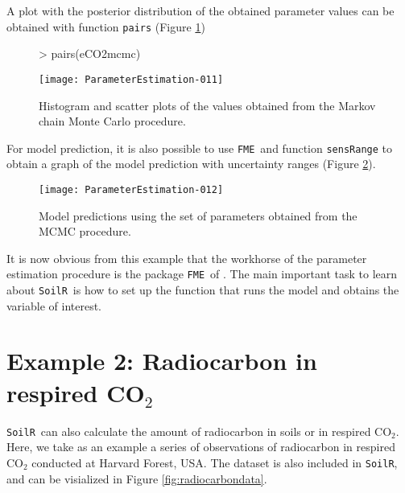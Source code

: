 \documentclass[a4paper]{article}
\newcommand{\SoilR}{\texttt{SoilR}}
\newcommand{\FME}{\texttt{FME}}
\begin{document}
A plot with the posterior distribution of the obtained parameter values can be obtained with function {\tt pairs} (Figure \ref{fig:mcmc})

\begin{figure}
  \centering
\begin{Schunk}
\begin{Sinput}
> pairs(eCO2mcmc)
\end{Sinput}
\end{Schunk}
\texttt{[image: ParameterEstimation-011]}
  \caption{Histogram and scatter plots of the values obtained from the Markov chain Monte Carlo procedure.}
  \label{fig:mcmc}
\end{figure}

For model prediction, it is also possible to use \FME \, and function {\tt sensRange} to obtain a graph of the model prediction with uncertainty ranges (Figure \ref{fig:sensRange}).

\begin{figure}
  \centering
\begin{Schunk}
\end{Schunk}
\texttt{[image: ParameterEstimation-012]}
  \caption{Model predictions using the set of parameters obtained from the MCMC procedure.}
  \label{fig:sensRange}
\end{figure}

\clearpage
It is now obvious from this example that the workhorse of the parameter estimation procedure is the package \FME \, of \citet{Soetaert}. The main important task to learn about \SoilR \, is how to set up the function that runs the model and obtains the variable of interest.  

\section*{Example 2: Radiocarbon in respired CO$_2$}
\SoilR \, can also calculate the amount of radiocarbon in soils or in respired CO$_2$. Here, we take as an example a series of observations of radiocarbon in respired CO$_2$ conducted at Harvard Forest, USA. The dataset is also included in \SoilR, and can be visialized in Figure \ref{fig:radiocarbondata}.
\end{document}
